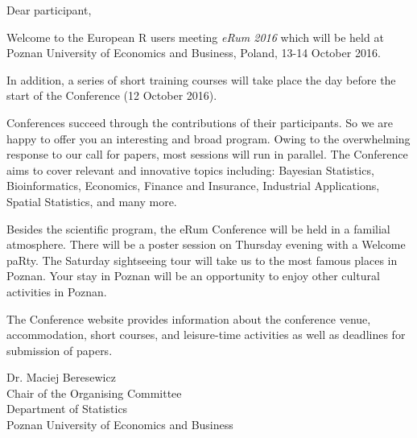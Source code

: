 Dear participant,

Welcome to the European R users meeting \textit{eRum 2016} which will be held at Poznan University of Economics and Business, Poland, 13-14 October 2016.

In addition, a series of short training courses will take place the day before the start of the Conference (12 October 2016).

Conferences succeed through the contributions of their participants. So we are happy to offer you an interesting and broad program. Owing to the overwhelming response to our call for papers, most sessions will run in parallel. The Conference aims to cover relevant and innovative topics including: Bayesian Statistics, Bioinformatics, Economics, Finance and Insurance, Industrial Applications, Spatial Statistics, and many more.

Besides the scientific program, the eRum Conference will be held in a familial atmosphere. There will be a poster session on Thursday evening with a Welcome paRty. The Saturday sightseeing tour will take us to the most famous places in Poznan. Your stay in Poznan will be an opportunity to enjoy other cultural activities in Poznan.

The Conference website provides information about the conference venue, accommodation, short courses, and leisure-time activities as well as deadlines for submission of papers.

\vspace{1.5cm}

\begin{flushleft}
Dr. Maciej Beresewicz \\
\vspace{0.5cm}
Chair of the Organising Committee \\ 
Department of Statistics \\ 
Poznan University of Economics and Business
\end{flushleft}
